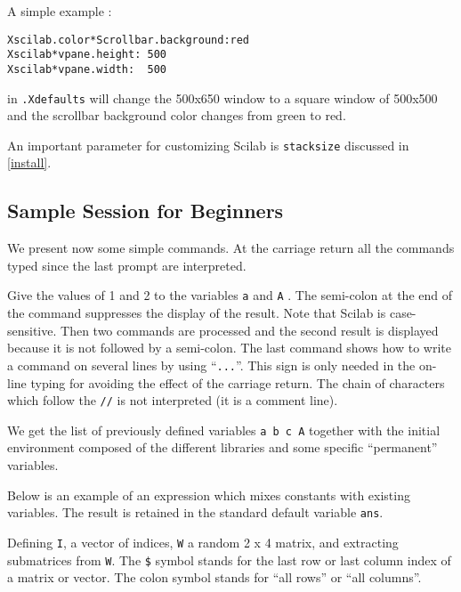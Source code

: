 A simple example : 

\begin{verbatim}
Xscilab.color*Scrollbar.background:red
Xscilab*vpane.height: 500
Xscilab*vpane.width:  500
\end{verbatim}

in {\tt .Xdefaults} will change the 500x650 window to a square window of 
500x500 and the  
scrollbar background color changes from green to red.

An important parameter for customizing Scilab is \verb!stacksize!
discussed in \ref{install}.

\subsection{Sample Session for Beginners}

We present now some simple commands. At the carriage return all the 
commands typed since the last prompt are interpreted. 

\noindent\dotfill



Give the values of 1 and 2 to the variables {\tt a} and { \tt A} .  The 
semi-colon at the end of the command suppresses the display of the result.
Note that Scilab is case-sensitive.
Then two commands are processed and the second result is displayed because
it is not followed by a semi-colon. The last command shows how to write a
command on several lines by using ``{\tt ...}''. This sign is only needed
in the on-line typing for avoiding the effect of the carriage return.
 The chain of characters which follow the {\tt //} is not interpreted 
(it is a comment line).

\noindent\dotfill



We get the list of previously defined variables {\tt a b c A}  together
with the initial environment composed of the different libraries and
some specific ``permanent'' variables.

Below is an example of an expression which mixes constants with existing
variables.  The result is retained in the standard default variable 
{\tt ans}.

\noindent\dotfill



Defining {\tt I}, a vector of indices, {\tt W} a random 2 x 4 matrix,
and extracting submatrices from {\tt W}. The \verb!$! symbol stands
for the last row or last column index of a matrix or vector. The colon
symbol stands for ``all rows'' or ``all columns''.


